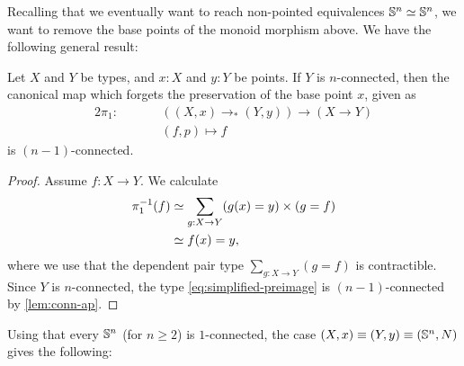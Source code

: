 \documentclass[english,a4]{article}
\newcommand{\ptdto}{\to_\ast}%
\newcommand{\setTrunc}[1]{\Trunc{#1}_0}
\begin{document}
Recalling that we eventually want to reach non-pointed equivalences ${\mathbb S^{n}} \simeq {\mathbb S^{n}}$, 
we want to remove the base points of the monoid morphism above. 
We have the following general result:


\begin{lemma} \label{lem:forget-points-conn}
    Let $X$ and $Y$ be types, and $x : X$ and $y : Y$ be points. If $Y$ is $n$-connected, then the canonical map which forgets the preservation of the base point $x$, given as
    \begin{alignat}{2}
    \pi_1: && \quad & ((X,x) \ptdto (Y,y)) \to (X \to Y) \\
    &&& (f,p) \mapsto f
    \end{alignat}
    is $(n-1)$-connected. 
\end{lemma}
\begin{proof}
    Assume $f : X \to Y$.
    We calculate
    \begin{align}
      \pi_1^{-1}(f)
      &\simeq \sum_{g : X \to Y}(g(x) = y) \times (g = f) \\
      &\simeq f(x) = y, \label{eq:simplified-preimage}
    \end{align}
    where we use that the dependent pair type $\sum_{g : X \to Y} (g = f)$ is contractible.
    Since $Y$ is $n$-connected, the type \eqref{eq:simplified-preimage} is $(n-1)$-connected by \cref{lem:conn-ap}.
%    
\end{proof}

Using that every ${\mathbb S^{n}}$ (for $n \geq 2$) is $1$-connected, the case $(X,x) \equiv (Y,y) \equiv ({\mathbb S^{n}}, N)$ gives the following:
%
\end{document}
